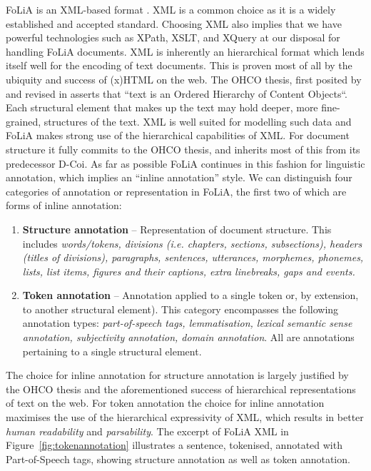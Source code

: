 \documentclass[a4paper,10pt,twoside]{article}
\begin{document}
FoLiA is an XML-based format \cite{XML}. XML is a common choice as it is a
widely established and accepted standard. Choosing XML also implies that we
have powerful technologies such as XPath, XSLT, and XQuery at our disposal for
handling FoLiA documents. XML is inherently an hierarchical format which lends
itself well for the encoding of text documents. This is proven most of all by
the ubiquity and success of (x)HTML on the web.  The OHCO thesis, first posited
by \cite{OHCO1} and revised in \cite{OHCO2} asserts that ``text is an Ordered
Hierarchy of Content Objects``. Each structural element that makes up the text
may hold deeper, more fine-grained, structures of the text. XML is well suited
for modelling such data and FoLiA makes strong use of the hierarchical
capabilities of XML. For document structure it fully commits to the OHCO
thesis, and inherits most of this from its predecessor D-Coi. As far as
possible FoLiA continues in this fashion for linguistic annotation, which
implies an ``inline annotation'' style. We can distinguish four categories of
annotation or representation in FoLiA, the first two of which are forms of
inline annotation:

\begin{enumerate}
\item \textbf{Structure annotation} -- Representation of document structure.
  This includes \emph{words/tokens, divisions (i.e. chapters, sections,
  subsections), headers (titles of divisions), paragraphs, sentences,
  utterances, morphemes,
  phonemes, lists,
  list items, figures and their captions, extra linebreaks, gaps and events.}
\item \textbf{Token annotation} -- Annotation applied to a single token or, by
  extension, to another structural element). This category encompasses the
  following annotation types: \emph{part-of-speech tags, lemmatisation, lexical
  semantic sense annotation, subjectivity annotation, domain annotation}. All
  are annotations pertaining to a single structural element.
  \setcounter{enumTemptwo}{\theenumi}
\end{enumerate}

The choice for inline annotation for structure annotation is largely justified
by the OHCO thesis and the aforementioned success of hierarchical representations of text on
the web. For token annotation the choice for inline annotation maximises the
use of the hierarchical expressivity of XML, which results in better \emph{human
readability} and \emph{parsability}. The excerpt of FoLiA XML in
Figure~\ref{fig:tokenannotation} illustrates a sentence, tokenised, annotated with
Part-of-Speech tags, showing structure annotation as well as token annotation.
\end{document}
